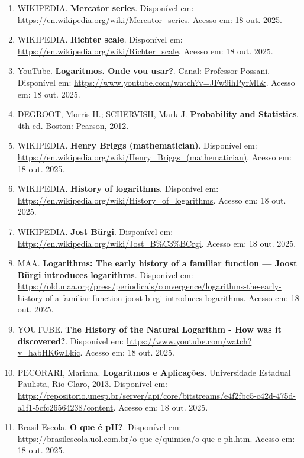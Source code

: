 \begin{enumerate}
\item WIKIPEDIA. \textbf{Mercator series}. Disponível em: \url{https://en.wikipedia.org/wiki/Mercator_series}. Acesso em: 18 out. 2025.

\item WIKIPEDIA. \textbf{Richter scale}. Disponível em: \url{https://en.wikipedia.org/wiki/Richter_scale}. Acesso em: 18 out. 2025.

\item YouTube. \textbf{Logaritmos. Onde vou usar?}. Canal: Professor Possani. Disponível em: \url{https://www.youtube.com/watch?v=JFw9ihPyrMI&}. Acesso em: 18 out. 2025.

\item DEGROOT, Morris H.; SCHERVISH, Mark J. \textbf{Probability and Statistics}. 4th ed. Boston: Pearson, 2012.

\item WIKIPEDIA. \textbf{Henry Briggs (mathematician)}. Disponível em: \url{https://en.wikipedia.org/wiki/Henry_Briggs_(mathematician)}. Acesso em: 18 out. 2025.

\item WIKIPEDIA. \textbf{History of logarithms}. Disponível em: \url{https://en.wikipedia.org/wiki/History_of_logarithms}. Acesso em: 18 out. 2025.

\item WIKIPEDIA. \textbf{Jost Bürgi}. Disponível em: \url{https://en.wikipedia.org/wiki/Jost_B%C3%BCrgi}. Acesso em: 18 out. 2025.

\item MAA. \textbf{Logarithms: The early history of a familiar function — Joost Bürgi introduces logarithms}. Disponível em: \url{https://old.maa.org/press/periodicals/convergence/logarithms-the-early-history-of-a-familiar-function-joost-b-rgi-introduces-logarithms}. Acesso em: 18 out. 2025.

\item YOUTUBE. \textbf{The History of the Natural Logarithm - How was it discovered?}. Disponível em: \url{https://www.youtube.com/watch?v=habHK6wLkic}. Acesso em: 18 out. 2025.

\item PECORARI, Mariana. \textbf{Logaritmos e Aplicações}. Universidade Estadual Paulista, Rio Claro, 2013. Disponível em: \url{https://repositorio.unesp.br/server/api/core/bitstreams/e4f2fbc5-c42d-475d-a1f1-5cfc26564238/content}. Acesso em: 18 out. 2025.

\item Brasil Escola. \textbf{O que é pH?}. Disponível em: \url{https://brasilescola.uol.com.br/o-que-e/quimica/o-que-e-ph.htm}. Acesso em: 18 out. 2025.

\end{enumerate}
